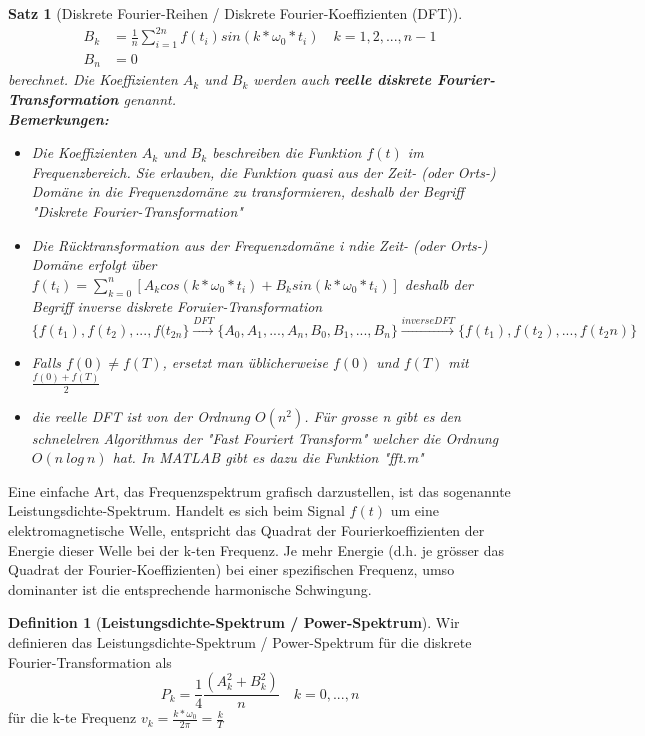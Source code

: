 \documentclass{article}
\theoremstyle{satz}
\newtheorem*{satz}{Satz}
\theoremstyle{definition}
\newtheorem{definition}{Definition}
\begin{document}
\begin{tcolorbox}
\begin{satz}[Diskrete Fourier-Reihen / Diskrete Fourier-Koeffizienten (DFT)]
\begin{equation}
\begin{split}
	B_k &= \frac{1}{n} \sum\limits_{i=1}^{2n} f(t_i) sin(k * \omega_0 * t_i) \quad k=1,2,...,n-1\\
	B_n &= 0
\end{split}
\end{equation}
berechnet. Die Koeffizienten $A_k$ und $B_k$ werden auch \textbf{reelle diskrete Fourier-Transformation} genannt.\\
\textbf{Bemerkungen: }\\
\begin{itemize}
	\item Die Koeffizienten $A_k$ und $B_k$ beschreiben die Funktion $f(t)$ im Frequenzbereich. Sie erlauben, die Funktion quasi aus der Zeit- (oder Orts-) Domäne in die Frequenzdomäne zu transformieren, deshalb der Begriff "Diskrete Fourier-Transformation"
	\item {Die Rücktransformation aus der Frequenzdomäne i ndie Zeit- (oder Orts-) Domäne erfolgt über $f(t_i) = \sum\limits^n_{k=0} [A_k cos(k * \omega_0 * t_i) + B_k sin(k * \omega_0 * t_i)]$ deshalb der Begriff \dq inverse diskrete Foruier-Transformation\dq
	\begin{equation}
		\{f(t_1), f(t_2), ..., f(t_{2n}\} \stackrel{DFT}\rightarrow \{A_0, A_1, ..., A_n, B_0, B_1, ..., B_n\} \stackrel{inverse DFT}\rightarrow \{f(t_1), f(t_2), ..., f(t_2n)\}
	\end{equation}		
	}
	\item Falls $f(0) \neq f(T)$, ersetzt man üblicherweise $f(0)$ und $f(T)$ mit $\frac{f(0)+f(T)}{2}$
	\item die reelle DFT ist von der Ordnung $O(n^2)$. Für grosse n gibt es den schnelelren Algorithmus der "Fast Fouriert Transform" welcher die Ordnung $O(n\ log\ n)$ hat. In MATLAB gibt es dazu die Funktion "fft.m"
\end{itemize}
\end{satz}
\end{tcolorbox}

Eine einfache Art, das Frequenzspektrum grafisch darzustellen, ist das sogenannte Leistungsdichte-Spektrum. Handelt es sich beim Signal $f(t)$ um eine elektromagnetische Welle, entspricht das Quadrat der Fourierkoeffizienten der Energie dieser Welle bei der k-ten Frequenz. Je mehr Energie (d.h. je grösser das Quadrat der Fourier-Koeffizienten) bei einer spezifischen Frequenz, umso dominanter ist die entsprechende harmonische Schwingung.

\theoremstyle{definition}
\begin{tcolorbox}
\begin{definition}[\textbf{Leistungsdichte-Spektrum / Power-Spektrum}]
Wir definieren das Leistungsdichte-Spektrum / Power-Spektrum für die diskrete Fourier-Transformation als
\begin{equation}
	P_k = \frac{1}{4}\frac{(A^2_k + B^2_k)}{n} \quad k = 0, ..., n
\end{equation}
für die k-te Frequenz $v_k = \frac{k*\omega_0}{2 \pi} = \frac{k}{T}$
\end{definition}
\end{tcolorbox}
\end{document}
